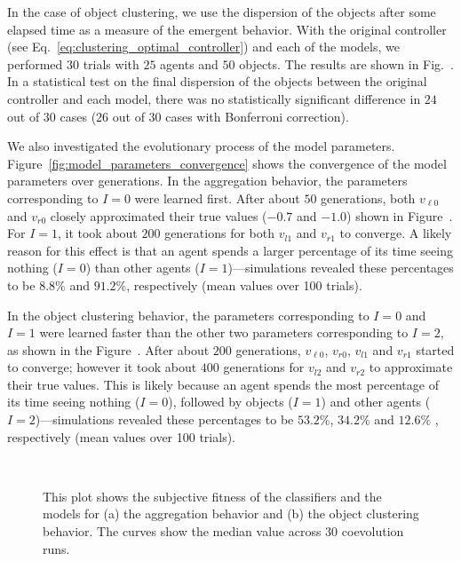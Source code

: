 In the case of object clustering, we use the dispersion of the objects after some elapsed time as a measure of the emergent behavior. With the original controller (see Eq.~\eqref{eq:clustering_optimal_controller}) and each of the models, we performed $30$ trials with $25$ agents and $50$ objects. The results are shown in Fig.~. In a statistical test on the final dispersion of the objects between the original controller and each model, there was no statistically significant difference in $24$ out of $30$ cases ($26$ out of $30$ cases with Bonferroni correction).

We also investigated the evolutionary process of the model parameters. Figure~\ref{fig:model_parameters_convergence} shows the convergence of the model parameters over generations. In the aggregation behavior, the parameters corresponding to $I=0$ were learned first. After about $50$ generations, both $v_{\ell0}$ and $v_{r0}$ closely approximated their true values ($-0.7$ and $-1.0$) shown in Figure~. For $I=1$, it took about $200$ generations for both $v_{l1}$ and $v_{r1}$ to converge. A likely reason for this effect is that an agent spends a larger percentage of its time seeing nothing ($I=0$) than other agents ($I=1$)---simulations revealed these percentages to be $8.8\%$ and $91.2\%$, respectively (mean values over 100 trials). 

In the object clustering behavior, the parameters corresponding to $I=0$ and $I=1$ were learned faster than the other two parameters corresponding to $I=2$, as shown in the Figure~. After about $200$ generations, $v_{\ell0}$, $v_{r0}$, $v_{l1}$ and $v_{r1}$ started to converge; however it took about $400$ generations for $v_{l2}$ and $v_{r2}$ to approximate their true values. This is likely because an agent spends the most percentage of its time seeing nothing ($I=0$), followed by objects ($I=1$) and other agents ($I=2$)---simulations revealed these percentages to be $53.2\%$, $34.2\%$ and $12.6\%$ , respectively (mean values over 100 trials).

\begin{figure}[!t]%
	\centering
		\\
		\caption{This plot shows the subjective fitness of the classifiers and
		the models for (a) the aggregation behavior and (b) the object clustering behavior.
		The curves show the median value across 30 coevolution runs.\label{fig:fitness_dynamics_simulation}}
\end{figure}

